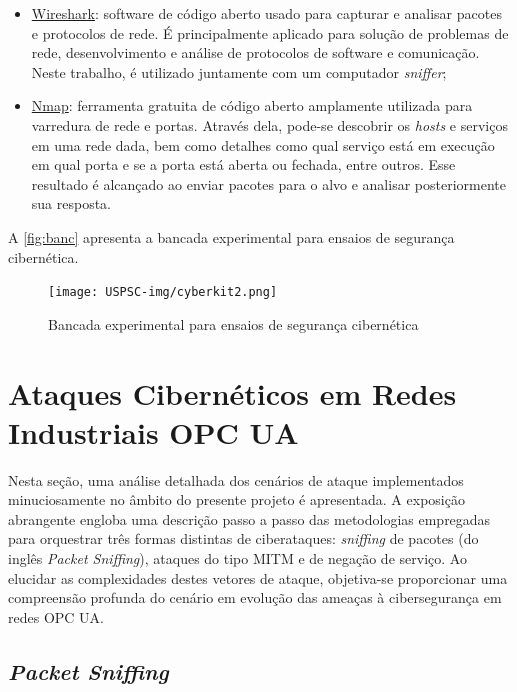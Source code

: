 \begin{itemize}
        \item \underline{Wireshark}: software de código aberto usado para capturar e analisar pacotes e protocolos de rede. É principalmente aplicado para solução de problemas de rede, desenvolvimento e análise de protocolos de software e comunicação. Neste trabalho, é utilizado juntamente com um computador \textit{sniffer};
        \item \underline{Nmap}: ferramenta gratuita de código aberto amplamente utilizada para varredura de rede e portas. Através dela, pode-se descobrir os \textit{hosts} e serviços em uma rede dada, bem como detalhes como qual serviço está em execução em qual porta e se a porta está aberta ou fechada, entre outros. Esse resultado é alcançado ao enviar pacotes para o alvo e analisar posteriormente sua resposta.
    \end{itemize}

    A \autoref{fig:banc} apresenta a bancada experimental para ensaios de segurança cibernética.
    
    \begin{figure}[htbp]
        \caption{\label{fig:banc}Bancada experimental para ensaios de segurança cibernética}
        \begin{center}
            \texttt{[image: USPSC-img/cyberkit2.png]}
        \end{center}
    \end{figure}

\section{Ataques Cibernéticos em Redes Industriais OPC UA} \label{sec:attacks}

    Nesta seção, uma análise detalhada dos cenários de ataque implementados minuciosamente no âmbito do presente projeto é apresentada. A exposição abrangente engloba uma descrição passo a passo das metodologias empregadas para orquestrar três formas distintas de ciberataques: \textit{sniffing} de pacotes (do inglês \textit{Packet Sniffing}), ataques do tipo MITM e de negação de serviço. Ao elucidar as complexidades destes vetores de ataque, objetiva-se proporcionar uma compreensão profunda do cenário em evolução das ameaças à cibersegurança em redes OPC UA.

    \subsection{\textit{Packet Sniffing}}

